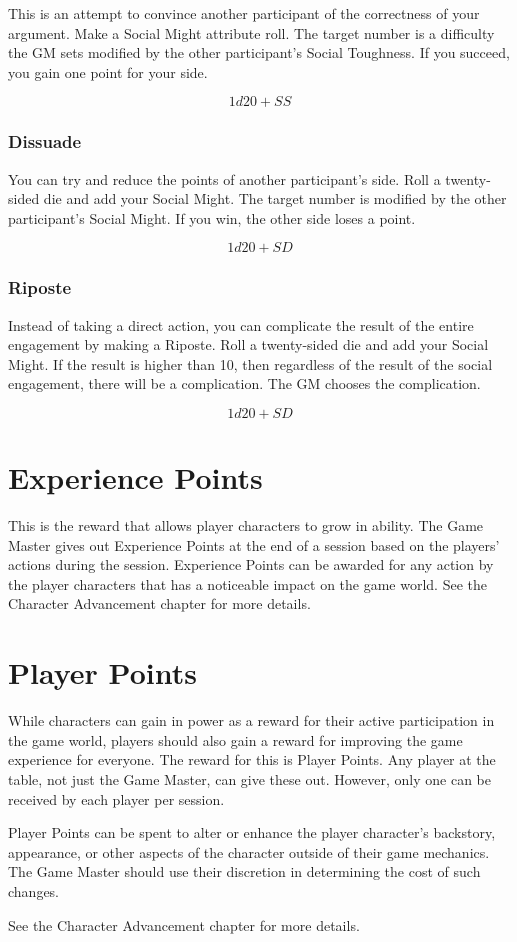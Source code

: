 \begin{multicols}{2}
This is an attempt to convince another participant of the correctness of your argument. Make a
Social Might attribute roll. The target number is a difficulty the GM sets modified by the other
participant's Social Toughness. If you succeed, you gain one point for your side.

$$1d20 + SS$$

\subsubsection{Dissuade}

You can try and reduce the points of another participant's side. Roll a twenty-sided die
and add your Social Might. The target number is modified by the other participant's
Social Might. If you win, the other side loses a point.

$$1d20 + SD$$

\subsubsection{Riposte}

Instead of taking a direct action, you can complicate the result of the entire engagement
by making a Riposte. Roll a twenty-sided die and add your Social Might. If the result
is higher than 10, then regardless of the result of the social engagement, there will be
a complication. The GM chooses the complication.

$$1d20 + SD$$

\section{Experience Points}

This is the reward that allows player characters to grow in ability. The Game Master gives
out Experience Points at the end of a session based on the players' actions during the
session. Experience Points can be awarded for any action by the player characters that
has a noticeable impact on the game world. See the Character Advancement chapter for
more details.

\section{Player Points}

While characters can gain in power as a reward for their active participation in the game
world, players should also gain a reward for improving the game experience for everyone.
The reward for this is Player Points. Any player at the table, not just the Game Master,
can give these out. However, only one can be received by each player per session.

Player Points can be spent to alter or enhance the player character's backstory, appearance,
or other aspects of the character outside of their game mechanics. The Game Master should
use their discretion in determining the cost of such changes.

See the Character Advancement chapter for more details.

\end{multicols}
